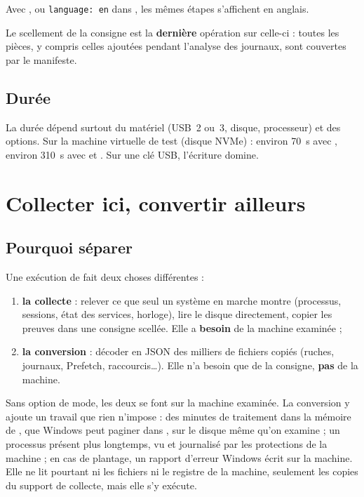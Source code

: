 \documentclass[11pt,a4paper,oneside]{report}
\begin{document}
Avec , ou \texttt{language: en} dans , les
mêmes étapes s'affichent en anglais.

Le scellement de la consigne est la \textbf{dernière} opération sur celle-ci :
toutes les pièces, y compris celles ajoutées pendant l'analyse des journaux, sont
couvertes par le manifeste.

\section{Durée}

La durée dépend surtout du matériel (USB~2 ou~3, disque, processeur) et des
options. Sur la machine virtuelle de test (disque NVMe) : environ 70~s avec
, environ 310~s avec  et . Sur une clé USB,
l'écriture domine.

\chapter{Collecter ici, convertir ailleurs}\label{chap:separation}

\section{Pourquoi séparer}

Une exécution de \wac{} fait deux choses différentes :
\begin{enumerate}
  \item \textbf{la collecte} : relever ce que seul un système en marche montre
        (processus, sessions, état des services, horloge), lire le disque
        directement, copier les preuves dans une consigne scellée. Elle a
        \textbf{besoin} de la machine examinée ;
  \item \textbf{la conversion} : décoder en JSON des milliers de fichiers
        copiés (ruches, journaux, Prefetch, raccourcis\ldots). Elle n'a besoin
        que de la consigne, \textbf{pas} de la machine.
\end{enumerate}

Sans option de mode, les deux se font sur la machine examinée. La conversion y
ajoute un travail que rien n'impose : des minutes de traitement dans la mémoire
de \wac{}, que Windows peut paginer dans , sur le disque
même qu'on examine ; un processus présent plus longtemps, vu et journalisé par
les protections de la machine ; en cas de plantage, un rapport d'erreur Windows
écrit sur la machine. Elle ne lit pourtant ni les fichiers ni le registre de la
machine, seulement les copies du support de collecte, mais elle s'y exécute.
\end{document}
